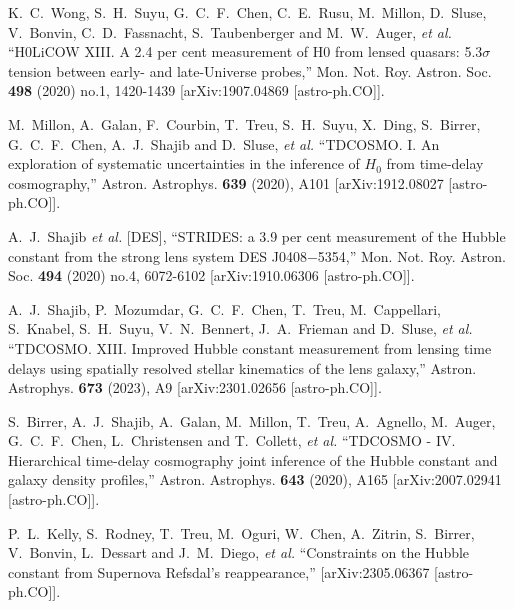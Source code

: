 \documentclass[aps,prl,10pt,twocolumn,superscriptaddress]{revtex4}
\begin{document}
\begin{thebibliography}{99}

K.~C.~Wong, S.~H.~Suyu, G.~C.~F.~Chen, C.~E.~Rusu, M.~Millon, D.~Sluse, V.~Bonvin, C.~D.~Fassnacht, S.~Taubenberger and M.~W.~Auger, \textit{et al.}
``H0LiCOW \textendash{} XIII. A 2.4 per cent measurement of H0 from lensed quasars: 5.3\ensuremath{\sigma} tension between early- and late-Universe probes,''
Mon. Not. Roy. Astron. Soc. \textbf{498} (2020) no.1, 1420-1439
[arXiv:1907.04869 [astro-ph.CO]].

M.~Millon, A.~Galan, F.~Courbin, T.~Treu, S.~H.~Suyu, X.~Ding, S.~Birrer, G.~C.~F.~Chen, A.~J.~Shajib and D.~Sluse, \textit{et al.}
``TDCOSMO. I. An exploration of systematic uncertainties in the inference of $H_0$ from time-delay cosmography,''
Astron. Astrophys. \textbf{639} (2020), A101
[arXiv:1912.08027 [astro-ph.CO]].

A.~J.~Shajib \textit{et al.} [DES],
``STRIDES: a 3.9 per cent measurement of the Hubble constant from the strong lens system DES J0408\ensuremath{-}5354,''
Mon. Not. Roy. Astron. Soc. \textbf{494} (2020) no.4, 6072-6102
[arXiv:1910.06306 [astro-ph.CO]].

A.~J.~Shajib, P.~Mozumdar, G.~C.~F.~Chen, T.~Treu, M.~Cappellari, S.~Knabel, S.~H.~Suyu, V.~N.~Bennert, J.~A.~Frieman and D.~Sluse, \textit{et al.}
``TDCOSMO. XIII. Improved Hubble constant measurement from lensing time delays using spatially resolved stellar kinematics of the lens galaxy,''
Astron. Astrophys. \textbf{673} (2023), A9
[arXiv:2301.02656 [astro-ph.CO]].

S.~Birrer, A.~J.~Shajib, A.~Galan, M.~Millon, T.~Treu, A.~Agnello, M.~Auger, G.~C.~F.~Chen, L.~Christensen and T.~Collett, \textit{et al.}
``TDCOSMO - IV. Hierarchical time-delay cosmography \textendash{} joint inference of the Hubble constant and galaxy density profiles,''
Astron. Astrophys. \textbf{643} (2020), A165
[arXiv:2007.02941 [astro-ph.CO]].

P.~L.~Kelly, S.~Rodney, T.~Treu, M.~Oguri, W.~Chen, A.~Zitrin, S.~Birrer, V.~Bonvin, L.~Dessart and J.~M.~Diego, \textit{et al.}
``Constraints on the Hubble constant from Supernova Refsdal's reappearance,''
[arXiv:2305.06367 [astro-ph.CO]].


\end{thebibliography}
\end{document}
